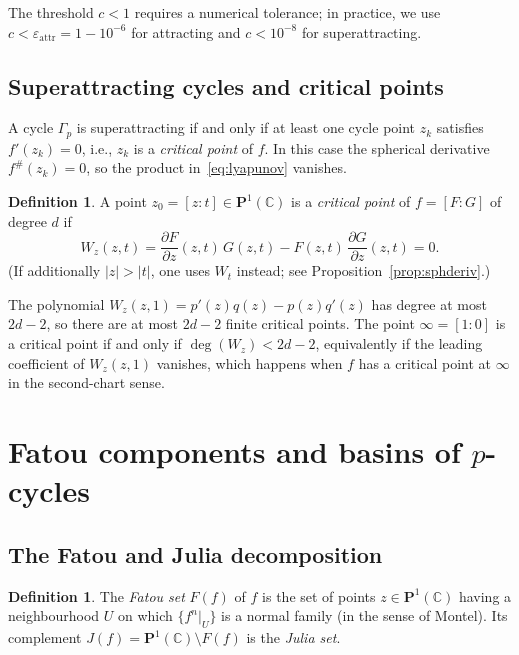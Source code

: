 \documentclass[12pt]{article}
\theoremstyle{definition}
\newtheorem{definition}[theorem]{Definition}
\newcommand{\C}{\mathbb{C}}
\newcommand{\Pone}{\mathbf{P}^1(\C)}
\newcommand{\fsh}{f^{\#}}
\newcommand{\Ff}{F(f)}
\newcommand{\Jf}{J(f)}
\newcommand{\hpair}{[F:G]}
\begin{document}
The threshold $c<1$ requires a numerical tolerance; in practice, we use
$c<\varepsilon_{\mathrm{attr}}=1-10^{-6}$ for attracting and
$c<10^{-8}$ for superattracting.

\subsection{Superattracting cycles and critical points}

A cycle $\Gamma_p$ is superattracting if and only if at least one cycle
point $z_k$ satisfies $f'(z_k)=0$, i.e., $z_k$ is a \emph{critical point}
of $f$.  In this case the spherical derivative $\fsh(z_k)=0$, so the product
in~\eqref{eq:lyapunov} vanishes.

\begin{definition}\label{def:critical}
A point $z_0=[z:t]\in\Pone$ is a \emph{critical point} of $f=\hpair$ of
degree $d$ if
\[
  W_z(z,t) = \frac{\partial F}{\partial z}(z,t)\,G(z,t)
            - F(z,t)\,\frac{\partial G}{\partial z}(z,t) = 0.
\]
(If additionally $|z|>|t|$, one uses $W_t$ instead; see
Proposition~\ref{prop:sphderiv}.)
\end{definition}

The polynomial $W_z(z,1) = p'(z)q(z)-p(z)q'(z)$ has degree at most
$2d-2$, so there are at most $2d-2$ finite critical points.  The point
$\infty=[1:0]$ is a critical point if and only if $\deg(W_z)<2d-2$,
equivalently if the leading coefficient of $W_z(z,1)$ vanishes, which
happens when $f$ has a critical point at $\infty$ in the second-chart
sense.

\section{Fatou components and basins of $p$-cycles}
\label{sec:fatou}

\subsection{The Fatou and Julia decomposition}

\begin{definition}
The \emph{Fatou set} $\Ff$ of $f$ is the set of points $z\in\Pone$
having a neighbourhood $U$ on which $\{f^n|_U\}$ is a normal family
(in the sense of Montel).  Its complement $\Jf=\Pone\setminus\Ff$ is
the \emph{Julia set}.
\end{definition}
\end{document}
